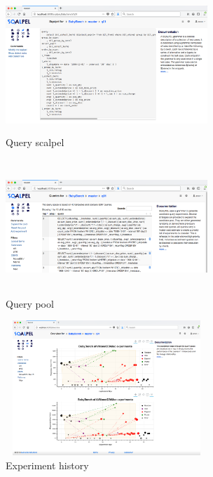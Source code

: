 \documentclass{cidr-2019}
\begin{document}


\begin{figure}[t!]
  \centering
  \includegraphics[height=2in,width=3in]{Figures/scalpel2.png}
  \caption{Query scalpel
    \label{fig:scalpel}}
\end{figure}



\begin{figure}[t!]
\centering
\includegraphics[height=2in,width=3in]{Figures/querypool2.png}
\caption{Query pool
	\label{fig:querypool2}}
\end{figure}

\begin{figure}[t!]
\centering
\includegraphics[height=2in,width=3in]{Figures/history2.png}
\caption{Experiment history
	\label{fig:history}}
\end{figure}
\end{document}
